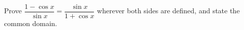Prove $\dfrac{1-\cos x}{\sin x}=\dfrac{\sin x}{1+\cos x}$ wherever both sides are defined, and state the common domain.

